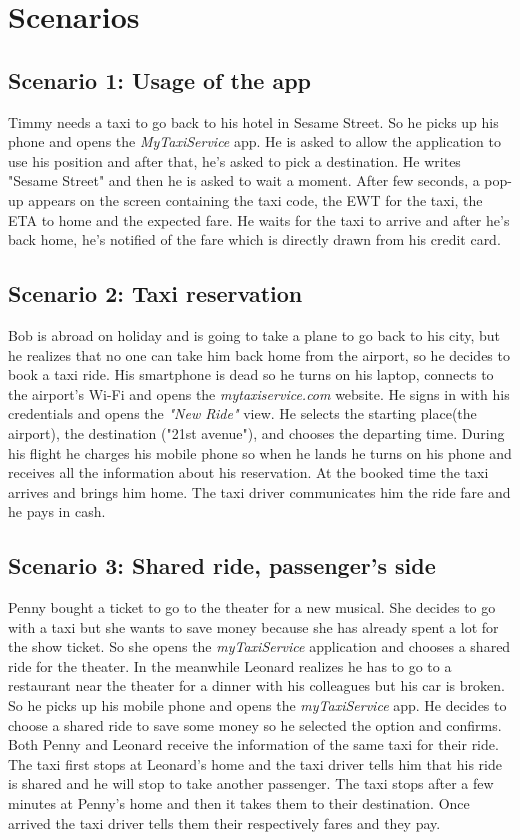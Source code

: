 \documentclass{article}
\begin{document}
\section{Scenarios}

\subsection{Scenario 1: Usage of the app}
Timmy needs a taxi to go back to his hotel in Sesame Street. So he picks up his phone and opens the \textit{MyTaxiService} app.
He is asked to allow the application to use his position and after that, he's asked to pick a destination. He writes "Sesame Street" and then he is asked to wait a moment.
After few seconds, a pop-up appears on the screen containing the taxi code, the EWT for the taxi, the ETA to home and the expected fare.
He waits for the taxi to arrive and after he's back home, he's notified of the fare which is directly drawn from his credit card.

\subsection{Scenario 2: Taxi reservation}
Bob is abroad on holiday and is going to take a plane to go back to his city, but he realizes that no one can take him back home from the airport, so he decides to book a taxi ride. His smartphone is dead so he turns on his laptop, connects to the airport's Wi-Fi and opens the \textit{mytaxiservice.com} website. He signs in with his credentials and opens the \textit{"New Ride"} view. He selects the starting place(the airport), the destination ("21st avenue"), and chooses the departing time. During his flight he charges his mobile phone so when he lands he turns on his phone and receives all the information about his reservation. At the booked time the taxi arrives and brings him home. The taxi driver communicates him the ride fare and he pays in cash.

\subsection{Scenario 3: Shared ride, passenger's side}
Penny bought a ticket to go to the theater for a new musical. She decides to go with a taxi but she wants to save money because she has already spent a lot for the show ticket. So she opens the \textit{myTaxiService} application and chooses a shared ride for the theater.
In the meanwhile Leonard realizes he has to go to a restaurant near the theater for a dinner with his colleagues but his car is broken. So he picks up his mobile phone and opens the \textit{myTaxiService} app. He decides to choose a shared ride to save some money so he selected the option and confirms.
Both Penny and Leonard receive the information of the same taxi for their ride. The taxi first stops at Leonard's home and the taxi driver tells him that his ride is shared and he will stop to take another passenger. The taxi stops after a few minutes at Penny's home and then it takes them to their destination. Once arrived the taxi driver tells them their respectively fares and they pay.
\end{document}
